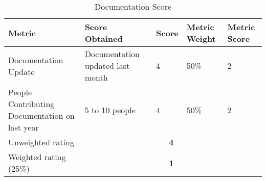 \documentclass[11pt]{article}
\begin{document}
\begin{table}[H]
  \begin{center}
    \begin{tabular}{ | p{4cm} | p{3cm} | l | p{1.2cm} | p{1.2cm} | }
    \hline
    \textbf{Metric} & \textbf{Score Obtained} & \textbf{Score} & \textbf{Metric Weight} & \textbf{Metric Score}\\
    \hline
    Documentation Update & Documentation updated last month & 4 & 50\% & 2\\
    \hline
    People Contributing Documentation on last year & 5 to 10 people & 4 & 50\% & 2\\
    \hline
    Unweighted rating & \multicolumn{4}{c|}{\textbf{4}}\\
    \hline
    Weighted rating (25\%) & \multicolumn {4}{c|}{\textbf{1}}\\
    \hline
    \end{tabular}
    \caption{Documentation Score}
    \label{tab:docu_score}
  \end{center}
\end{table}
\end{document}
